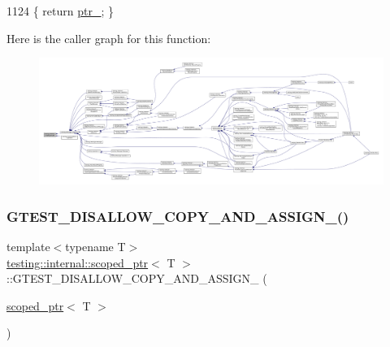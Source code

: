 \begin{DoxyCode}
1124 \{ \textcolor{keywordflow}{return} \hyperlink{classtesting_1_1internal_1_1scoped__ptr_ab69d9f1f216ae91f8b8abca63e797397}{ptr\_}; \}
\end{DoxyCode}
Here is the caller graph for this function\+:
\nopagebreak
\begin{figure}[H]
\begin{center}
\leavevmode
\includegraphics[width=350pt]{classtesting_1_1internal_1_1scoped__ptr_aa5984291e12453f1e81b7676d1fa26fd_icgraph}
\end{center}
\end{figure}
\mbox{\label{classtesting_1_1internal_1_1scoped__ptr_aa905e98e04e868208e9fb850b93d58f4}} 
\subsubsection{\texorpdfstring{G\+T\+E\+S\+T\+\_\+\+D\+I\+S\+A\+L\+L\+O\+W\+\_\+\+C\+O\+P\+Y\+\_\+\+A\+N\+D\+\_\+\+A\+S\+S\+I\+G\+N\+\_\+()}{GTEST\_DISALLOW\_COPY\_AND\_ASSIGN\_()}}
{\footnotesize\ttfamily template$<$typename T$>$ \\
\hyperlink{classtesting_1_1internal_1_1scoped__ptr}{testing\+::internal\+::scoped\+\_\+ptr}$<$ T $>$\+::G\+T\+E\+S\+T\+\_\+\+D\+I\+S\+A\+L\+L\+O\+W\+\_\+\+C\+O\+P\+Y\+\_\+\+A\+N\+D\+\_\+\+A\+S\+S\+I\+G\+N\+\_\+ (\begin{DoxyParamCaption}\item[{\hyperlink{classtesting_1_1internal_1_1scoped__ptr}{scoped\+\_\+ptr}$<$ T $>$}]{ }\end{DoxyParamCaption})\hspace{0.3cm}{\ttfamily [private]}}

